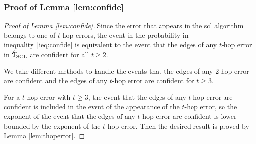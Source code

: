 \subsubsection{Proof of Lemma \ref{lem:confide}}
\begin{proof}[Proof of Lemma \ref{lem:confide}]
	Since the error that appears in the \ac{scl} algorithm belongs to one of $t$-hop errors, the event in the probability in inequality~\eqref{ieq:confide} is equivalent to the event that the edges of any $t$-hop error in $\hat{\mathcal{T}}_{\rm{SCL}}$ are confident for all $t\geq 2$.

	We take different methods to handle the events that the edges of any 2-hop error are confident and the edges of any $t$-hop error are confident for $t\geq 3$.

	For a $t$-hop error with $t\geq 3$, the event that the edges of any $t$-hop error are confident is included in the event of the appearance of the $t$-hop error, so the exponent of the event that the edges of 
	any $t$-hop error are confident is lower bounded by the exponent of the $t$-hop error. Then the desired result is proved by Lemma \ref{lem:thoperror}.


\end{proof}
